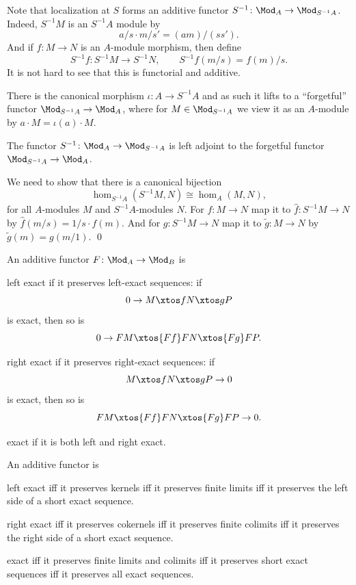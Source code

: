 \edefn

Note that localization at $S$ forms an additive functor $S^{-1}\colon\Mod_A\to\Mod_{S^{-1}A}$.
Indeed, $S^{-1}M$ is an $S^{-1}A$ module by
$$ a/s\cdot m/s' = (am)/(ss') . $$
And if $f\colon M\to N$ is an $A$-module morphism, then define
$$ S^{-1}f\colon S^{-1}M\to S^{-1}N,\qquad S^{-1}f(m/s) = f(m)/s . $$
It is not hard to see that this is functorial and additive.

There is the canonical morphism $\iota\colon A\to S^{-1}A$ and as such it lifts to a ``forgetful'' functor $\Mod_{S^{-1}A}\to\Mod_A$,
where for $M\in\Mod_{S^{-1}A}$ we view it as an $A$-module by $a\cdot M=\iota(a)\cdot M$.

\bprop

    The functor $S^{-1}\colon\Mod_A\to\Mod_{S^{-1}A}$ is left adjoint to the forgetful functor $\Mod_{S^{-1}A}\to\Mod_A$.

\eprop

\bproof

    We need to show that there is a canonical bijection
    $$ \hom_{S^{-1}A}(S^{-1}M,N) \cong \hom_A(M,N) , $$
    for all $A$-modules $M$ and $S^{-1}A$-modules $N$.
    For $f\colon M\to N$ map it to $\hat f\colon S^{-1}M\to N$ by $\hat f(m/s)=1/s\cdot f(m)$.
    And for $g\colon S^{-1}M\to N$ map it to $\tilde g\colon M\to N$ by $\tilde g(m)=g(m/1)$.
    \qed

\eproof

\bdefn

    An additive functor $F\colon\Mod_A\to\Mod_B$ is
    \benum
        \item {\emphcolor left exact} if it preserves left-exact sequences: if
        $$ 0 \to M \xtos f N \xtos g P $$
        is exact, then so is
        $$ 0 \to FM \xtos{Ff} FN \xtos{Fg} FP . $$
        \item {\emphcolor right exact} if it preserves right-exact sequences: if
        $$ M \xtos f N \xtos g P \to 0 $$
        is exact, then so is
        $$ FM \xtos{Ff} FN \xtos{Fg} FP\to 0. $$
        \item {\emphcolor exact} if it is both left and right exact.
    \eenum

\edefn

\bprop

    An additive functor is
    \benum
        \item left exact iff it preserves kernels iff it preserves finite limits iff it preserves the left side of a short exact sequence.
        \item right exact iff it preserves cokernels iff it preserves finite colimits iff it preserves the right side of a short exact sequence.
        \item exact iff it preserves finite limits and colimits iff it preserves short exact sequences iff it preserves all exact sequences.
    \eenum

